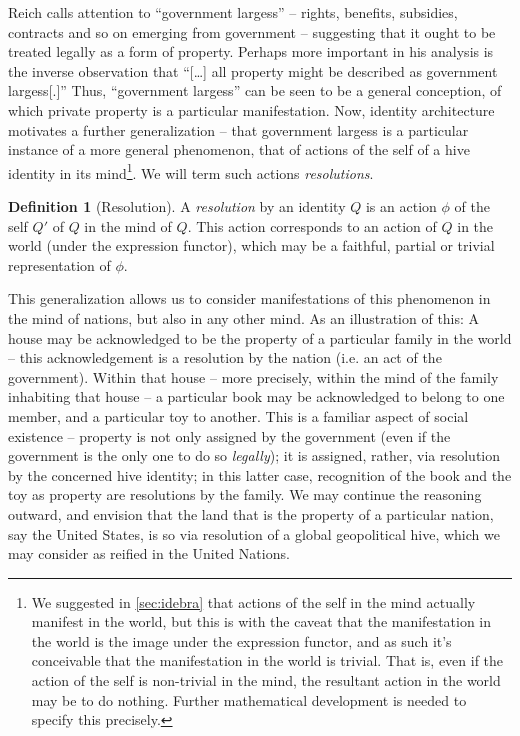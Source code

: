 \documentclass[pra,twocolumn,groupedaddress,10pt]{revtex4}
\theoremstyle{definition}
\newtheorem{defn}{Definition}[section]
\begin{document}
Reich\cite{reich} calls attention to ``government largess'' -- rights, benefits, subsidies, contracts and so on emerging from government -- suggesting that it ought to be treated legally as a form of property. Perhaps more important in his analysis is the inverse observation that ``[\ldots] all property might be described as government largess[.]'' Thus, ``government largess'' can be seen to be a general conception, of which private property is a particular manifestation. Now, identity architecture motivates a further generalization -- that government largess is a particular instance of a more general phenomenon, that of actions of the self of a hive identity in its mind\footnote{We suggested in \autoref{sec:idebra} that actions of the self in the mind actually manifest in the world, but this is with the caveat that the manifestation in the world is the image under the expression functor, and as such it's conceivable that the manifestation in the world is trivial. That is, even if the action of the self is non-trivial in the mind, the resultant action in the world may be to do nothing. Further mathematical development is needed to specify this precisely.}. We will term such actions \textit{resolutions}.

\begin{defn}[Resolution]
	A \emph{resolution} by an identity $Q$ is an action $\phi$ of the self $Q'$ of $Q$ in the mind of $Q$. This action corresponds to an action of $Q$ in the world (under the expression functor), which may be a faithful, partial or trivial representation of $\phi$.
\end{defn}

This generalization allows us to consider manifestations of this phenomenon in the mind of nations, but also in any other mind. As an illustration of this: A house may be acknowledged to be the property of a particular family in the world -- this acknowledgement is a resolution by the nation (i.e. an act of the government). Within that house -- more precisely, within the mind of the family inhabiting that house -- a particular book may be acknowledged to belong to one member, and a particular toy to another. This is a familiar aspect of social existence -- property is not only assigned by the government (even if the government is the only one to do so \textit{legally}); it is assigned, rather, via resolution by the concerned hive identity; in this latter case, recognition of the book and the toy as property are resolutions by the family. We may continue the reasoning outward, and envision that the land that is the property of a particular nation, say the United States, is so via resolution of a global geopolitical hive, which we may consider as reified in the United Nations.
\end{document}
